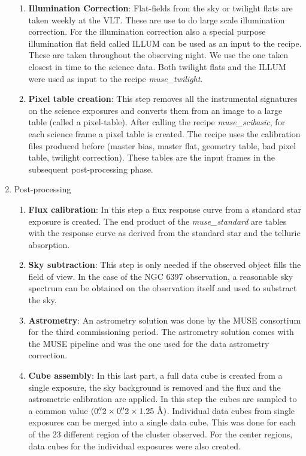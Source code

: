 \begin{enumerate}
\begin{enumerate}[I]
			\item \textbf{Illumination Correction}: Flat-fields from the sky or twilight flats are taken weekly at the VLT. These are use to do large scale illumination correction. For the illumination correction also a special purpose  illumination flat field called ILLUM can be used as an input to the recipe. These are taken throughout the observing night. We use the one taken closest in time to the science data. Both twilight flats and the ILLUM were used as input to the recipe \emph{muse\_twilight}.
    
    \item{\textbf{Pixel table creation}}: This step removes all the instrumental signatures on the science exposures and converts them from an image to a large table (called a pixel-table). After calling the recipe \emph{muse\_scibasic}, for each science frame a pixel table is created. The recipe uses the calibration files produced before (master bias, master flat, geometry table, bad pixel table, twilight correction). These tables are the input frames in the subsequent post-processing phase.
    \end{enumerate}
\item Post-processing
                \begin{enumerate}[I]
			\item \textbf{Flux calibration}:  In this step a flux response curve from a standard star exposure is created. The end product of the \emph{muse\_standard} are tables with the response curve as derived from the standard star and the telluric absorption.
                        \item \textbf{Sky subtraction}: This step is only needed if the observed object fills the field of view. In the case of the NGC 6397 observation, a reasonable sky spectrum can be obtained on the observation itself and used to substract the sky.   
                        \item \textbf{Astrometry}: An astrometry solution was done by the MUSE consortium for the third commissioning period. The astrometry solution comes with the MUSE pipeline and was the one used for the data astrometry correction.  
          
                        \item \textbf{Cube assembly}: In this last part, a full data cube is created from a single exposure, the sky background is removed and the flux and the astrometric calibration are applied. In this step the cubes are sampled to a common value $(0\farcs 2 \times 0\farcs 2 \times 1.25 \text{ \r A})$. Individual data cubes from single exposures can be merged into a single data cube. This was done for each of the 23 different region of the cluster observed. For the center regions, data cubes for the individual exposures were also created.  
                \end{enumerate}
\end{enumerate}


